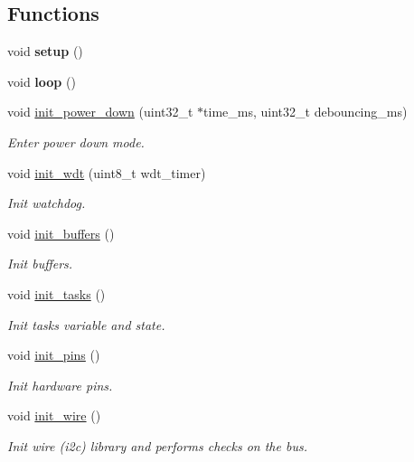 \subsection*{Functions}
\begin{DoxyCompactItemize}
\item 
\mbox{\label{i2c-rain_8ino_a4fc01d736fe50cf5b977f755b675f11d}} 
void {\bfseries setup} ()
\item 
\mbox{\label{i2c-rain_8ino_afe461d27b9c48d5921c00d521181f12f}} 
void {\bfseries loop} ()
\item 
void \hyperlink{i2c-rain_8ino_afb98a0f07c30784284f48271ffe02b97}{init\+\_\+power\+\_\+down} (uint32\+\_\+t $\ast$time\+\_\+ms, uint32\+\_\+t debouncing\+\_\+ms)
\begin{DoxyCompactList}\small\item\em Enter power down mode. \end{DoxyCompactList}\item 
void \hyperlink{i2c-rain_8ino_a980e73df66b14b1190bc25da430a4f12}{init\+\_\+wdt} (uint8\+\_\+t wdt\+\_\+timer)
\begin{DoxyCompactList}\small\item\em Init watchdog. \end{DoxyCompactList}\item 
void \hyperlink{i2c-rain_8ino_ad241cc00b1a92e6d85827df96778e442}{init\+\_\+buffers} ()
\begin{DoxyCompactList}\small\item\em Init buffers. \end{DoxyCompactList}\item 
void \hyperlink{i2c-rain_8ino_ab4bf0a3d77da083f131d3fa35a37d2b1}{init\+\_\+tasks} ()
\begin{DoxyCompactList}\small\item\em Init tasks variable and state. \end{DoxyCompactList}\item 
void \hyperlink{i2c-rain_8ino_ad8b80a0c08f928106018edd6ea435b95}{init\+\_\+pins} ()
\begin{DoxyCompactList}\small\item\em Init hardware pins. \end{DoxyCompactList}\item 
void \hyperlink{i2c-rain_8ino_a2441543100bf8421f56edd622a2c1d9a}{init\+\_\+wire} ()
\begin{DoxyCompactList}\small\item\em Init wire (i2c) library and performs checks on the bus. \end{DoxyCompactList}\item 

\end{DoxyCompactItemize}
